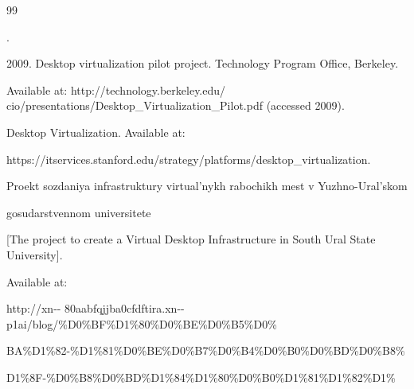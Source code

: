 











\vspace*{-6pt}



\renewcommand{\bibname}{\protect\rmfamily References}



{\small\frenchspacing

{%


\begin{thebibliography}{99}




. 

2009. Desktop virtualization pilot project. Technology Program Office, Berkeley. 

Available at:  {\sf http://technology.berkeley.edu/ cio/presentations/Desktop\_Virtualization\_Pilot.pdf} (accessed 2009).


Desktop Virtualization. Available at: 

{\sf https://itservices.stanford.edu/strategy/\linebreak platforms/desktop\_virtualization}.


Proekt sozdaniya infrastruktury virtual'nykh rabochikh mest v Yuzhno-Ural'skom 

gosudarstvennom universitete 

[The project to create a Virtual Desktop Infrastructure in South Ural State University]. 

Available at: {\sf 

http://xn\mbox{-}\mbox{-} 80aabfqjjba0cfdftira.xn\mbox{-}\mbox{-}p1ai/blog/\%D0\%BF\%D1\%80\%D0\%BE\%D0\%B5\%D0\%

BA\%D1\%82-\%D1\%81\%D0\%BE\%D0\%B7\%D0\%B4\%D0\%B0\%D0\%BD\%D0\%B8\%

D1\%8F-\%D0\%B8\%D0\%BD\%D1\%84\%D1\%80\%D0\%B0\%D1\%81\%D1\%82\%D1\%

}
\end{thebibliography}}}
